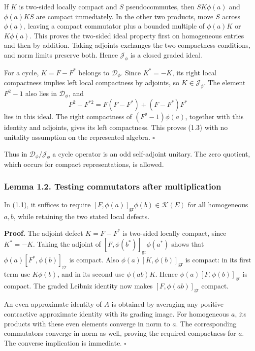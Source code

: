 \documentclass[
  11pt,
]{article}
\begin{document}
If \(K\) is two-sided locally compact and \(S\) pseudocommutes, then
\(SK\phi(a)\) and \(\phi(a)KS\) are compact immediately. In the other
two products, move \(S\) across \(\phi(a)\), leaving a compact
commutator plus a bounded multiple of \(\phi(a)K\) or \(K\phi(a)\). This
proves the two-sided ideal property first on homogeneous entries and
then by addition. Taking adjoints exchanges the two compactness
conditions, and norm limits preserve both. Hence \(\mathcal J_\phi\) is
a closed graded ideal.

For a cycle, \(K=F-F^*\) belongs to \(\mathcal D_\phi\). Since
\(K^*=-K\), its right local compactness implies left local compactness
by adjoints, so \(K\in\mathcal J_\phi\). The element \(F^2-1\) also lies
in \(\mathcal D_\phi\), and \[
F^2-F^{*2}=F(F-F^*)+(F-F^*)F^*
\] lies in this ideal. The right compactness of \((F^2-1)\phi(a)\),
together with this identity and adjoints, gives its left compactness.
This proves (1.3) with no unitality assumption on the represented
algebra. \(\square\)

Thus in \(\mathcal D_\phi/\mathcal J_\phi\) a cycle operator is an odd
self-adjoint unitary. The zero quotient, which occurs for compact
representations, is allowed.

\subsubsection{Lemma 1.2. Testing commutators after
multiplication}\label{lemma-1.2.-testing-commutators-after-multiplication}

In (1.1), it suffices to require
\([F,\phi(a)]_{\mathrm{gr}}\phi(b)\in\mathcal K(E)\) for all homogeneous
\(a,b\), while retaining the two stated local defects.

\textbf{Proof.} The adjoint defect \(K=F-F^*\) is two-sided locally
compact, since \(K^*=-K\). Taking the adjoint of
\([F,\phi(b^*)]_{\mathrm{gr}}\phi(a^*)\) shows that
\(\phi(a)[F^*,\phi(b)]_{\mathrm{gr}}\) is compact. Also
\(\phi(a)[K,\phi(b)]_{\mathrm{gr}}\) is compact: in its first term use
\(K\phi(b)\), and in its second use \(\phi(ab)K\). Hence
\(\phi(a)[F,\phi(b)]_{\mathrm{gr}}\) is compact. The graded Leibniz
identity now makes \([F,\phi(ab)]_{\mathrm{gr}}\) compact.

An even approximate identity of \(A\) is obtained by averaging any
positive contractive approximate identity with its grading image. For
homogeneous \(a\), its products with these even elements converge in
norm to \(a\). The corresponding commutators converge in norm as well,
proving the required compactness for \(a\). The converse implication is
immediate. \(\square\)
\end{document}
